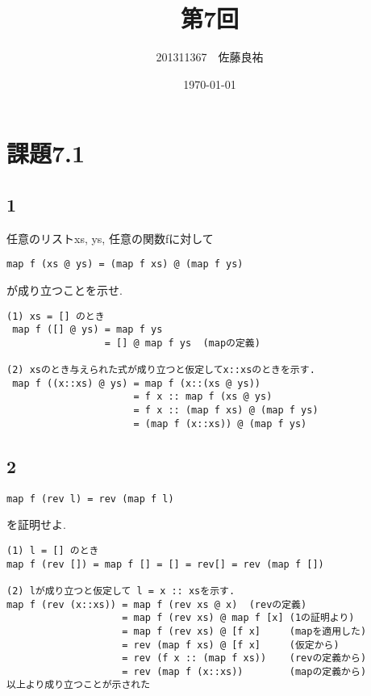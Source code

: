 \documentclass[11pt,a4j]{jarticle}
\title{第7回}
\author{201311367　佐藤良祐}
\date{\today}
\begin{document}
\section*{課題7.1}
\subsection*{1}
任意のリストxs, ys, 任意の関数fに対して
\begin{verbatim}
map f (xs @ ys) = (map f xs) @ (map f ys)    
\end{verbatim}
が成り立つことを示せ.
\begin{screen}
\begin{verbatim}
(1) xs = [] のとき  
 map f ([] @ ys) = map f ys
                 = [] @ map f ys  (mapの定義)

(2) xsのとき与えられた式が成り立つと仮定してx::xsのときを示す.
 map f ((x::xs) @ ys) = map f (x::(xs @ ys))
                      = f x :: map f (xs @ ys)
                      = f x :: (map f xs) @ (map f ys)
                      = (map f (x::xs)) @ (map f ys)
\end{verbatim}
\end{screen}
\subsection*{2}
\begin{verbatim}
map f (rev l) = rev (map f l)    
\end{verbatim}
を証明せよ.

\begin{screen}
\begin{verbatim}
(1) l = [] のとき
map f (rev []) = map f [] = [] = rev[] = rev (map f [])

(2) lが成り立つと仮定して l = x :: xsを示す.
map f (rev (x::xs)) = map f (rev xs @ x)  (revの定義)
                    = map f (rev xs) @ map f [x] (1の証明より)
                    = map f (rev xs) @ [f x]     (mapを適用した)
                    = rev (map f xs) @ [f x]     (仮定から)
                    = rev (f x :: (map f xs))    (revの定義から)
                    = rev (map f (x::xs))        (mapの定義から)
以上より成り立つことが示された   
\end{verbatim}
\end{screen}
\end{document}
